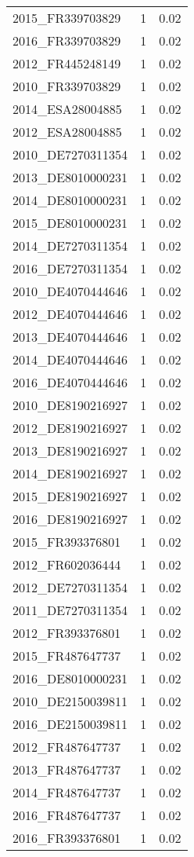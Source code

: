 \begin{table*}[htbp]
\begin{tabular}{lrr}
2015_FR339703829 & 1 & 0.02 \\
2016_FR339703829 & 1 & 0.02 \\
2012_FR445248149 & 1 & 0.02 \\
2010_FR339703829 & 1 & 0.02 \\
2014_ESA28004885 & 1 & 0.02 \\
2012_ESA28004885 & 1 & 0.02 \\
2010_DE7270311354 & 1 & 0.02 \\
2013_DE8010000231 & 1 & 0.02 \\
2014_DE8010000231 & 1 & 0.02 \\
2015_DE8010000231 & 1 & 0.02 \\
2014_DE7270311354 & 1 & 0.02 \\
2016_DE7270311354 & 1 & 0.02 \\
2010_DE4070444646 & 1 & 0.02 \\
2012_DE4070444646 & 1 & 0.02 \\
2013_DE4070444646 & 1 & 0.02 \\
2014_DE4070444646 & 1 & 0.02 \\
2016_DE4070444646 & 1 & 0.02 \\
2010_DE8190216927 & 1 & 0.02 \\
2012_DE8190216927 & 1 & 0.02 \\
2013_DE8190216927 & 1 & 0.02 \\
2014_DE8190216927 & 1 & 0.02 \\
2015_DE8190216927 & 1 & 0.02 \\
2016_DE8190216927 & 1 & 0.02 \\
2015_FR393376801 & 1 & 0.02 \\
2012_FR602036444 & 1 & 0.02 \\
2012_DE7270311354 & 1 & 0.02 \\
2011_DE7270311354 & 1 & 0.02 \\
2012_FR393376801 & 1 & 0.02 \\
2015_FR487647737 & 1 & 0.02 \\
2016_DE8010000231 & 1 & 0.02 \\
2010_DE2150039811 & 1 & 0.02 \\
2016_DE2150039811 & 1 & 0.02 \\
2012_FR487647737 & 1 & 0.02 \\
2013_FR487647737 & 1 & 0.02 \\
2014_FR487647737 & 1 & 0.02 \\
2016_FR487647737 & 1 & 0.02 \\
2016_FR393376801 & 1 & 0.02 \\

\end{tabular}
\end{table*}
